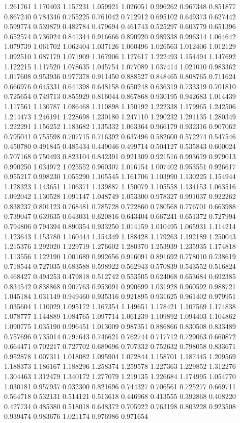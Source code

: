 1.261761
1.170403
1.157231
1.059921
1.026051
0.996262
0.967348
0.851877
0.867240
0.784346
0.755225
0.761042
0.712912
0.695102
0.649373
0.627442
0.599774
0.539879
0.482784
0.479694
0.461743
0.525297
0.603779
0.651396
0.652574
0.736024
0.841344
0.916666
0.890920
0.989338
0.996314
1.064642
1.079739
1.061702
1.062404
1.037126
1.060496
1.026563
1.012406
1.012129
1.092510
1.087179
1.071909
1.167906
1.127617
1.222493
1.154494
1.147692
1.122215
1.117520
1.078635
1.045754
1.077089
1.037414
1.021010
0.983362
1.017608
0.953936
0.977378
0.911450
0.888527
0.848465
0.808765
0.711624
0.666976
0.645331
0.641398
0.648158
0.650248
0.636319
0.733319
0.701810
0.725654
0.749713
0.855929
0.816044
0.867868
0.930195
0.942683
1.014439
1.117561
1.130787
1.086468
1.110898
1.150192
1.222338
1.179965
1.242506
1.214473
1.246191
1.228698
1.230180
1.247110
1.290232
1.291135
1.280349
1.222291
1.156252
1.183682
1.135332
1.063364
0.966179
0.932316
0.907062
0.795041
0.755598
0.707715
0.716392
0.637496
0.582600
0.572274
0.547546
0.450780
0.491845
0.485434
0.449046
0.499714
0.504127
0.535843
0.600024
0.707168
0.750493
0.823104
0.842391
0.921309
0.921516
0.993679
0.979013
0.990250
1.034972
1.025552
0.960307
1.016154
1.007402
0.953551
0.926617
0.955217
0.998230
1.055290
1.105545
1.161706
1.103990
1.130225
1.154944
1.128323
1.143651
1.106371
1.139887
1.150079
1.105558
1.134153
1.063516
1.092042
1.130528
1.091147
1.048749
1.053300
0.978327
0.991037
0.922262
0.838237
0.801123
0.768481
0.785728
0.722860
0.780568
0.776701
0.663988
0.739047
0.639635
0.643031
0.620816
0.643404
0.667241
0.651372
0.727994
0.794806
0.794394
0.890354
0.933250
1.014159
1.010495
1.065931
1.114214
1.123643
1.153780
1.160444
1.154349
1.188428
1.179263
1.192189
1.250043
1.215376
1.292020
1.229719
1.276602
1.280370
1.253939
1.235935
1.174818
1.113556
1.122190
1.001689
0.992656
0.916091
0.891692
0.778010
0.738619
0.718544
0.727035
0.683588
0.598922
0.562943
0.570839
0.543552
0.516824
0.468427
0.494253
0.479818
0.512742
0.553505
0.624068
0.653684
0.692385
0.834542
0.838868
0.907763
0.953091
0.990699
1.031928
0.960592
0.988721
1.045184
1.031149
0.949460
0.935316
0.921895
0.931625
0.961402
0.979951
1.035604
1.110029
1.095172
1.167354
1.149651
1.178421
1.107569
1.174838
1.078777
1.144889
1.084765
1.097714
1.061239
1.109892
1.094403
1.104862
1.090775
1.035190
0.996451
1.013009
0.987351
0.886866
0.830508
0.833489
0.757696
0.735014
0.797643
0.746621
0.762744
0.717712
0.729063
0.660872
0.664471
0.702217
0.727702
0.689696
0.707332
0.752632
0.798058
0.833671
0.952878
1.007311
1.018082
1.095904
1.072844
1.158701
1.187445
1.209569
1.188373
1.186167
1.188296
1.258374
1.259578
1.227363
1.229852
1.312276
1.304463
1.312479
1.340172
1.277079
1.219135
1.226684
1.174995
1.054770
1.030181
0.957937
0.932300
0.821696
0.744327
0.706561
0.725277
0.669711
0.564718
0.532131
0.514121
0.513618
0.446968
0.413555
0.392868
0.408220
0.427734
0.485380
0.518018
0.648372
0.705922
0.763198
0.803228
0.923508
0.939474
0.983676
1.021174
0.976986
0.971654
